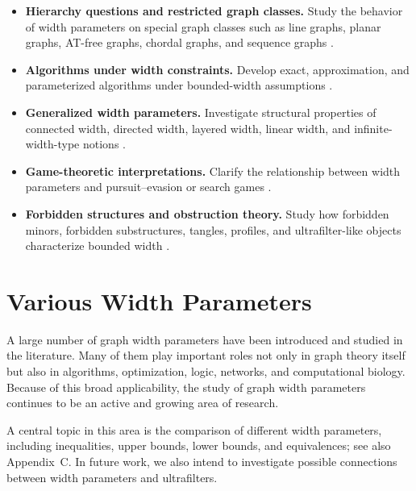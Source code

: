 \documentclass[10pt]{book}
\theoremstyle{definition}
\begin{document}
\begin{itemize}
    \item \textbf{Hierarchy questions and restricted graph classes.}
    Study the behavior of width parameters on special graph classes such as line graphs, planar graphs, AT-free graphs, chordal graphs, and sequence graphs
    \cite{bottcher2010bandwidth,cabello2012algorithms,69}.

    \item \textbf{Algorithms under width constraints.}
    Develop exact, approximation, and parameterized algorithms under bounded-width assumptions
    \cite{wanke1994bounded,kawarabayashi2008simpler,lagergren1996efficient,bodlaender1998parallel}.

    \item \textbf{Generalized width parameters.}
    Investigate structural properties of connected width, directed width, layered width, linear width, and infinite-width-type notions
    \cite{diestel2018connected,hamann2016bounding}.

    \item \textbf{Game-theoretic interpretations.}
    Clarify the relationship between width parameters and pursuit--evasion or search games
    \cite{kosowski2015k,Soares2013PursuitEvasionDA}.

    \item \textbf{Forbidden structures and obstruction theory.}
    Study how forbidden minors, forbidden substructures, tangles, profiles, and ultrafilter-like objects characterize bounded width
    \cite{Gurski2019ForbiddenDM,takahashi1995minimal}.
\end{itemize}

\newpage

\appendix

\chapter{Various Width Parameters}
A large number of graph width parameters have been introduced and studied in the literature.  
Many of them play important roles not only in graph theory itself but also in algorithms, optimization, logic, networks, and computational biology.  
Because of this broad applicability, the study of graph width parameters continues to be an active and growing area of research.

A central topic in this area is the comparison of different width parameters, including inequalities, upper bounds, lower bounds, and equivalences; see also Appendix~C.  
In future work, we also intend to investigate possible connections between width parameters and ultrafilters.
\end{document}
